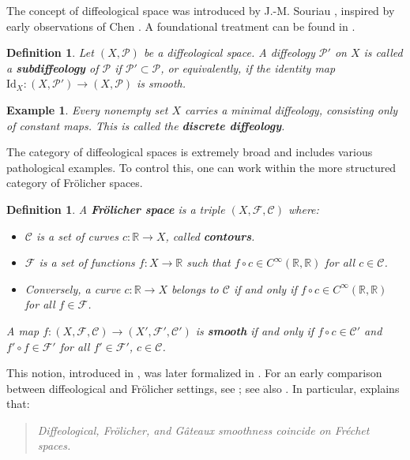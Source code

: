 \documentclass{amsart}
\def\R{\mathbb{R}}
\newcounter{thm}
\newcounter{ex}
\newcounter{re}
\newtheorem{example}[thm]{Example}
\newtheorem{Definition}[thm]{Definition}
\begin{document}
The concept of diffeological space was introduced by J.-M. Souriau \cite{Sou}, inspired by early observations of Chen \cite{Chen}. A foundational treatment can be found in \cite{Igdiff}.

\begin{Definition}
	Let $(X,\mathcal{P})$ be a diffeological space. A diffeology $\mathcal{P}'$ on $X$ is called a \textbf{subdiffeology} of $\mathcal{P}$ if $\mathcal{P}' \subset \mathcal{P}$, or equivalently, if the identity map $\mathrm{Id}_X: (X,\mathcal{P}') \to (X,\mathcal{P})$ is smooth.
\end{Definition}

\begin{example}
	Every nonempty set $X$ carries a minimal diffeology, consisting only of constant maps. This is called the \textbf{discrete diffeology}.
\end{example}

The category of diffeological spaces is extremely broad and includes various pathological examples. To control this, one can work within the more structured category of Fr\"olicher spaces.

\begin{Definition}
	A \textbf{Fr\"olicher space} is a triple $(X, \mathcal{F}, \mathcal{C})$ where:
	\begin{itemize}
		\item $\mathcal{C}$ is a set of curves $c: \R \to X$, called \textbf{contours}.
		\item $\mathcal{F}$ is a set of functions $f: X \to \R$ such that $f \circ c \in C^\infty(\R, \R)$ for all $c \in \mathcal{C}$.
		\item Conversely, a curve $c: \R \to X$ belongs to $\mathcal{C}$ if and only if $f \circ c \in C^\infty(\R,\R)$ for all $f \in \mathcal{F}$.
	\end{itemize}
	A map $f: (X, \mathcal{F}, \mathcal{C}) \to (X', \mathcal{F}', \mathcal{C}')$ is \textbf{smooth} if and only if $f \circ c \in \mathcal{C}'$ and $f' \circ f \in \mathcal{F}'$ for all $f' \in \mathcal{F}'$, $c \in \mathcal{C}$.
\end{Definition}

This notion, introduced in \cite{FK}, was later formalized in \cite{KM}. For an early comparison between diffeological and Fr\"olicher settings, see \cite{Ma2006-3}; see also \cite{BKW2024, Ma2013, Ma2018-2, MR2016, Wa}. In particular, \cite{MR2016} explains that:

\begin{quote}
	\emph{Diffeological, Fr\"olicher, and G\^ateaux smoothness coincide on Fr\'echet spaces.}
\end{quote}
\end{document}
